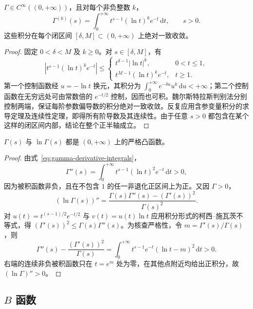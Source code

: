 \begin{theorem}[光滑性与各阶导数]
\label{thm:gamma-smoothness-derivatives}
$\Gamma\in C^\infty((0,+\infty))$，且对每个非负整数 $k$，
\begin{equation}
    \Gamma^{(k)}(s)=\int_0^{+\infty}
       t^{s-1}(\ln t)^k e^{-t}\,\mathrm{d}t,\qquad s>0.
    \label{eq:gamma-derivative-integrals}
\end{equation}
这些积分在每个闭区间 $[\delta,M]\subset(0,+\infty)$ 上绝对一致收敛。
\end{theorem}

\begin{proof}
固定 $0<\delta<M$ 及 $k\geq0$。对 $s\in[\delta,M]$，有
\[
    |t^{s-1}(\ln t)^k e^{-t}|
    \leq\begin{cases}
        t^{\delta-1}|\ln t|^k,&0<t\leq1,\\
        t^{M-1}(\ln t)^k e^{-t},&t\geq1.
    \end{cases}
\]
第一个控制函数经 $u=-\ln t$ 换元，其积分为 $\int_0^{+\infty}e^{-\delta u}u^k\,\mathrm{d}u<+\infty$；第二个控制函数在无穷远处可由常数倍的 $e^{-t/2}$ 控制，因而也可积。魏尔斯特拉斯判别法分别控制两端，保证每阶参数偏导数的积分绝对一致收敛。反复应用含参变量积分的求导定理及连续性定理，即得所有阶导数及其连续性。由于任意 $s>0$ 都包含在某个这样的闭区间内部，结论在整个正半轴成立。
\end{proof}

\begin{proposition}[严格凸性与严格对数凸性]
\label{prop:gamma-strict-log-convexity}
$\Gamma(s)$ 与 $\ln\Gamma(s)$ 都是 $(0,+\infty)$ 上的严格凸函数。
\end{proposition}

\begin{proof}
由式~\eqref{eq:gamma-derivative-integrals}，
\[
    \Gamma''(s)=\int_0^{+\infty}t^{s-1}(\ln t)^2e^{-t}\,\mathrm{d}t>0,
\]
因为被积函数非负，且在不包含 $1$ 的任一非退化正区间上为正。又因 $\Gamma>0$，
\[
    (\ln\Gamma(s))''
    =\frac{\Gamma(s)\Gamma''(s)-(\Gamma'(s))^2}{\Gamma(s)^2}.
\]
对 $u(t)=t^{(s-1)/2}e^{-t/2}$ 与 $v(t)=u(t)\ln t$ 应用积分形式的柯西--施瓦茨不等式，得 $(\Gamma'(s))^2\leq\Gamma(s)\Gamma''(s)$。为核查严格性，令 $m=\Gamma'(s)/\Gamma(s)$，则
\[
    \Gamma''(s)-\frac{(\Gamma'(s))^2}{\Gamma(s)}
    =\int_0^{+\infty}t^{s-1}e^{-t}(\ln t-m)^2\,\mathrm{d}t>0.
\]
右端的连续非负被积函数只在 $t=e^m$ 处为零，在其他点附近均给出正积分，故 $(\ln\Gamma)''>0$。
\end{proof}

\subsection{\texorpdfstring{$B$}{B} 函数}
\label{subsec:beta-function}

